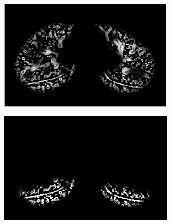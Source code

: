 {\begin{figure}[htbp]
\begin{subfigure}{.408\linewidth}
  \includegraphics[width=\linewidth,trim={{.0\wd0} {.0\wd0} {.0\wd0} {.0\wd0}},clip]{Segmentation/Image/FissureDetection2.jpg}
  \caption{}
	\label{fig:FissureDetection-c}
\end{subfigure}
\begin{subfigure}{.4\linewidth}%
  \includegraphics[width=\linewidth,trim={{.0\wd0} {.0\wd0} {.0\wd0} {.0\wd0}},clip]{Segmentation/Image/FissureDetection3.jpg}

\end{subfigure}
\end{figure}}
